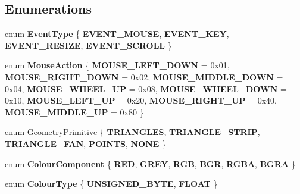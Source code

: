 \subsection*{\-Enumerations}
\begin{DoxyCompactItemize}
\item 
enum {\bfseries \-Event\-Type} \{ {\bfseries \-E\-V\-E\-N\-T\-\_\-\-M\-O\-U\-S\-E}, 
{\bfseries \-E\-V\-E\-N\-T\-\_\-\-K\-E\-Y}, 
{\bfseries \-E\-V\-E\-N\-T\-\_\-\-R\-E\-S\-I\-Z\-E}, 
{\bfseries \-E\-V\-E\-N\-T\-\_\-\-S\-C\-R\-O\-L\-L}
 \}
\item 
enum {\bfseries \-Mouse\-Action} \{ \*
{\bfseries \-M\-O\-U\-S\-E\-\_\-\-L\-E\-F\-T\-\_\-\-D\-O\-W\-N} =  0x01, 
{\bfseries \-M\-O\-U\-S\-E\-\_\-\-R\-I\-G\-H\-T\-\_\-\-D\-O\-W\-N} =  0x02, 
{\bfseries \-M\-O\-U\-S\-E\-\_\-\-M\-I\-D\-D\-L\-E\-\_\-\-D\-O\-W\-N} =  0x04, 
{\bfseries \-M\-O\-U\-S\-E\-\_\-\-W\-H\-E\-E\-L\-\_\-\-U\-P} =  0x08, 
\*
{\bfseries \-M\-O\-U\-S\-E\-\_\-\-W\-H\-E\-E\-L\-\_\-\-D\-O\-W\-N} =  0x10, 
{\bfseries \-M\-O\-U\-S\-E\-\_\-\-L\-E\-F\-T\-\_\-\-U\-P} =  0x20, 
{\bfseries \-M\-O\-U\-S\-E\-\_\-\-R\-I\-G\-H\-T\-\_\-\-U\-P} =  0x40, 
{\bfseries \-M\-O\-U\-S\-E\-\_\-\-M\-I\-D\-D\-L\-E\-\_\-\-U\-P} =  0x80
 \}
\item 
enum \hyperlink{namespaces9_ad57d1332f8fd67d23f6a1d3520ab785c}{\-Geometry\-Primitive} \{ \*
{\bfseries \-T\-R\-I\-A\-N\-G\-L\-E\-S}, 
{\bfseries \-T\-R\-I\-A\-N\-G\-L\-E\-\_\-\-S\-T\-R\-I\-P}, 
{\bfseries \-T\-R\-I\-A\-N\-G\-L\-E\-\_\-\-F\-A\-N}, 
{\bfseries \-P\-O\-I\-N\-T\-S}, 
\*
{\bfseries \-N\-O\-N\-E}
 \}
\item 
enum {\bfseries \-Colour\-Component} \{ \*
{\bfseries \-R\-E\-D}, 
{\bfseries \-G\-R\-E\-Y}, 
{\bfseries \-R\-G\-B}, 
{\bfseries \-B\-G\-R}, 
\*
{\bfseries \-R\-G\-B\-A}, 
{\bfseries \-B\-G\-R\-A}
 \}
\item 
enum {\bfseries \-Colour\-Type} \{ {\bfseries \-U\-N\-S\-I\-G\-N\-E\-D\-\_\-\-B\-Y\-T\-E}, 
{\bfseries \-F\-L\-O\-A\-T}
 \}
\end{DoxyCompactItemize}
